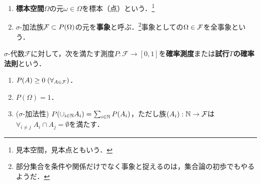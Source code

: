 \documentclass[uplatex,dvipdfmx]{jsreport}
\begin{document}
\begin{definition}\mbox{}
    \begin{enumerate}
        \item \textbf{標本空間}$\Omega$の元$\omega\in\Omega$を標本（点）という．\footnote{見本空間，見本点ともいう．}
        \item $\sigma$-加法族$\mathcal{F}\subset P(\Omega)$の元を\textbf{事象}と呼ぶ．\footnote{部分集合を条件や関係だけでなく事象と捉えるのは，集合論の初歩でもやるようだ．}事象としての$\Omega\in\mathcal{F}$を全事象という．
    \end{enumerate}
\end{definition}

\begin{definition}[probability]
    $\sigma$-代数$\mathcal{F}$に対して，次を満たす測度$P:\mathcal{F}\to[0,1]$を\textbf{確率測度}または\textbf{試行$T$の確率法則}という．
    \begin{enumerate}
        \item $P(A)\ge 0\;(\forall_{A\in\mathcal{F}})$．
        \item $P(\Omega)=1$．
        \item ($\sigma$-加法性) $P(\cup_{i\in\mathbb{N}}A_i)=\sum_{i\in\mathbb{N}}P(A_i)$，ただし族$(A_i):\mathbb{N}\to\mathcal{F}$は$\forall_{i\ne j}\;A_i\cap A_j=\emptyset$を満たす．
    \end{enumerate}
\end{definition}
\end{document}
